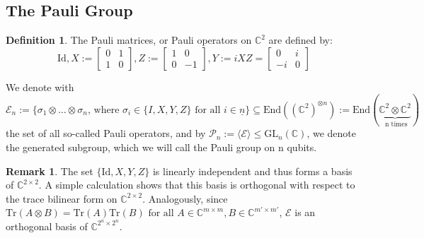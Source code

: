 \documentclass{article}
\def\N{\mathbb{N}}
\def\C{\mathbb{C}}
\def\GL{\text{GL}}
\def\n{\underline{n}}
\def\End{\text{End}}
\def\fa{\text{ for all }}
\def\Tr{\text{Tr}}
\def\Id{\text{Id}}
\theoremstyle{definition}
\newtheorem{theorem}[Satz]{Theorem}
\newtheorem{rem}[Satz]{Remark}
\newtheorem{defn}[Satz]{Definition}
\begin{document}
\subsection{The Pauli Group}

\begin{defn}\label{paulimat}
The Pauli matrices, or Pauli operators on $\C^2$ are defined by:
\begin{equation} \Id , X :=  \left[ \begin{array}{cc}
 0 & 1 \\
 1 & 0 \end{array} \right] , Z := \left[ \begin{array}{cc}
 1 & 0 \\
 0 & -1 \end{array} \right],  Y := i XZ = \left[ \begin{array}{cc}
 0 & i \\
 -i & 0 \end{array} \right]  \end{equation}



We denote with \begin{equation} \mathcal{E}_n:= \{ \sigma_1 \otimes \ldots \otimes \sigma_n \text{, where }\sigma_i \in \{ I,X,Y,Z \} \fa i \in \n \} \subseteq \End((\C^2)^{\otimes n}):= \End( \underbrace{\C^2 \otimes \C^2}_\text{ n times}) \end{equation}
the set of all so-called Pauli operators, and by $\mathcal{P}_n:= \langle \mathcal{E} \rangle \leq \GL_n(\C)$, we denote the generated subgroup, which we will call the Pauli group on n qubits. 
\end{defn}

\begin{rem}
The set $\{ \Id, X, Y, Z \}$ is linearly independent and thus forms a basis of $\C^{2 \times 2}$. A simple calculation shows that this basis is orthogonal with respect to the trace bilinear form on $\C^{2 \times 2}$. Analogously, since $\Tr(A \otimes B) = \Tr(A) \Tr(B) \fa A \in \C^{m \times m}, B \in \C^{m' \times m'}$, $\mathcal{E}$ is an orthogonal basis of $\C^{2^n \times 2^n}$.
\end{rem}


\end{document}
